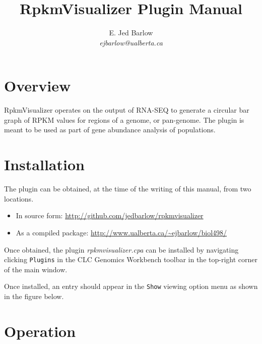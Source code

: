 \documentclass[12pt,letterpaper]{article}
\author{
    E. Jed Barlow\\
    \textit{ejbarlow@ualberta.ca}
}
\title{RpkmVisualizer Plugin Manual}
\begin{document}
\maketitle

\hfill

\tableofcontents

\newpage
\section{Overview}
RpkmVisualizer operates on the output of RNA-SEQ to generate a circular bar
graph of RPKM values for regions of a genome, or pan-genome.  The plugin is
meant to be used as part of gene abundance analysis of populations.

\section{Installation}
The plugin can be obtained, at the time of the writing of this manual, from two
locations.

\begin{itemize}
\item
    In source form: \url{http://github.com/jedbarlow/rpkmvisualizer}
\item
    As a compiled package: \url{http://www.ualberta.ca/~ejbarlow/biol498/}
\end{itemize}

Once obtained, the plugin \textit{rpkmvisualizer.cpa} can be installed by
navigating clicking \texttt{Plugins} in the CLC Genomics Workbench toolbar in
the top-right corner of the main window.

Once installed, an entry should appear in the \texttt{Show} viewing option menu
as shown in the figure below.

\section{Operation}
\end{document}

